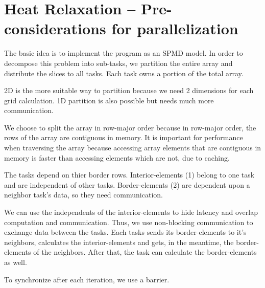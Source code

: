 \documentclass{article}
\newcommand{\enterProblemHeader}[1]{
}
\newcommand{\exitProblemHeader}[1]{
}
\newcounter{homeworkProblemCounter} %
\newcommand{\homeworkProblemName}{}
\newenvironment{homeworkProblem}[1][Problem \arabic{homeworkProblemCounter}]{ %
\stepcounter{homeworkProblemCounter} %
\renewcommand{\homeworkProblemName}{#1} %
\section{\homeworkProblemName} %
}{
}
\begin{document}
\begin{homeworkProblem}[Heat Relaxation – Pre-considerations for parallelization]
The basic idea is to implement the program as an SPMD model.
In order to decompose this problem into sub-tasks, we partition the entire array and
distribute the slices to all tasks. Each task owns a portion of the total array.

2D is the more suitable way to partition because we need 2 dimensions for each grid 
calculation. 1D partition is also possible but needs much more communication. 

We choose to split the array in row-major order because in row-major order, the rows
of the array are contiguous in memory. It is important for performance when traversing
the array because accessing array elements that are contiguous in memory is faster than
accessing elements which are not, due to caching.
\begin{center}
\end{center}

The tasks depend on thier border rows. Interior-elements (1) belong to one task and 
are independent of other tasks. Border-elements (2) are dependent upon a neighbor 
task's data, so they need communication.
\begin{center}
\end{center}

We can use the independents of the interior-elements to hide latency and overlap 
computation and communication. Thus, we use non-blocking communication to exchange
data between the tasks. Each tasks sends its border-elements to it's neighbors, calculates
the interior-elements and gets, in the meantime, the border-elements of the neighbors.
After that, the task can calculate the border-elements as well.

To synchronize after each iteration, we use a barrier.
\end{homeworkProblem} 
\clearpage
\end{document}
